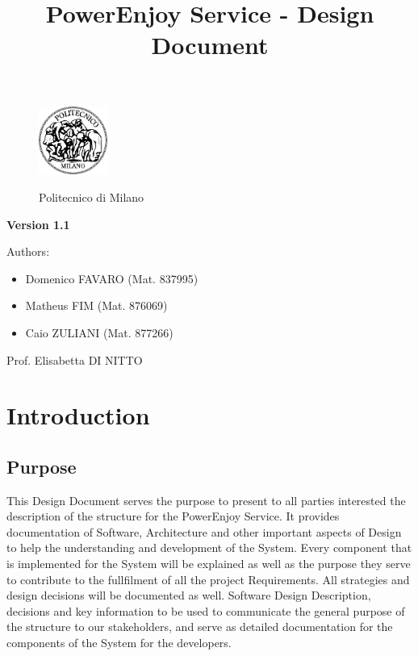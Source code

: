 \documentclass[a4paper]{article}
\title{PowerEnjoy Service - Design Document}
\begin{document}
\begin{titlepage}
\begin{figure}
\centering
\includegraphics[width=0.2\textwidth]{polimi.jpg}
\par
\LARGE Politecnico di Milano
\end{figure}


\maketitle
\textbf{Version 1.1}
\newline

\raggedright
Authors:
\begin{itemize}
	\item Domenico FAVARO (Mat. 837995)
        	\item Matheus FIM (Mat. 876069)
	\item Caio ZULIANI (Mat. 877266)	
\end{itemize}
\raggedleft
Prof. Elisabetta DI NITTO
\thispagestyle{empty}
\end{titlepage}

\tableofcontents
\newpage
 
\section{Introduction}
\subsection{Purpose}
This Design Document serves the purpose to present to all parties interested the description of the structure for the PowerEnjoy Service. It provides documentation of Software, Architecture and other important aspects of Design to help the understanding and development of the System. Every component that is implemented for the System will be explained as well as the purpose they serve to contribute to the fullfilment of all the project Requirements. All strategies and design decisions will be documented as well. Software Design Description, decisions and key information to be used to communicate the general purpose of the structure to our stakeholders, and serve as detailed documentation for the components of the System for the developers.
\end{document}
